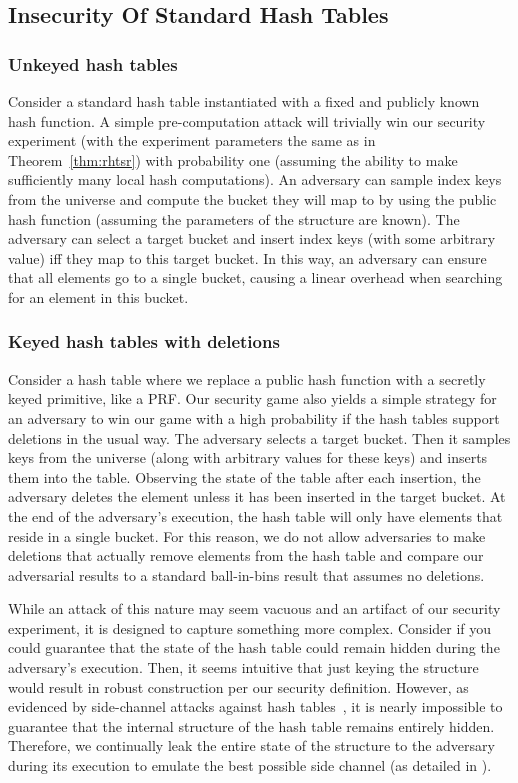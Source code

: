 \subsection{Insecurity Of Standard Hash Tables}

\subsubsection{Unkeyed hash tables}

Consider a standard hash table instantiated with a fixed and publicly known hash function. A simple pre-computation attack will trivially win our security experiment (with the experiment parameters the same as in Theorem~\ref{thm:rhtsr}) with probability one (assuming the ability to make sufficiently many local hash computations). An adversary can sample index keys from the universe and compute the bucket they will map to by using the public hash function (assuming the parameters of the structure are known). The adversary can select a target bucket and insert index keys (with some arbitrary value) iff they map to this target bucket. In this way, an adversary can ensure that all elements go to a single bucket, causing a linear overhead when searching for an element in this bucket.

\subsubsection{Keyed hash tables with deletions}

Consider a hash table where we replace a public hash function with a secretly keyed primitive, like a PRF. Our security game also yields a simple strategy for an adversary to win our game with a high probability if the hash tables support deletions in the usual way. The adversary selects a target bucket. Then it samples keys from the universe (along with arbitrary values for these keys) and inserts them into the table. Observing the state of the table after each insertion, the adversary deletes the element unless it has been inserted in the target bucket. At the end of the adversary's execution, the hash table will only have elements that reside in a single bucket. For this reason, we do not allow adversaries to make deletions that actually remove elements from the hash table and compare our adversarial results to a standard ball-in-bins result that assumes no deletions. 

While an attack of this nature may seem vacuous and an artifact of our security experiment, it is designed to capture something more complex. Consider if you could guarantee that the state of the hash table could remain hidden during the adversary's execution. Then, it seems intuitive that just keying the structure would result in robust construction per our security definition. However, as evidenced by side-channel attacks against hash tables~\cite{bar2007remote}, it is nearly impossible to guarantee that the internal structure of the hash table remains entirely hidden. Therefore, we continually leak the entire state of the structure to the adversary during its execution to emulate the best possible side channel (as detailed in ). 

